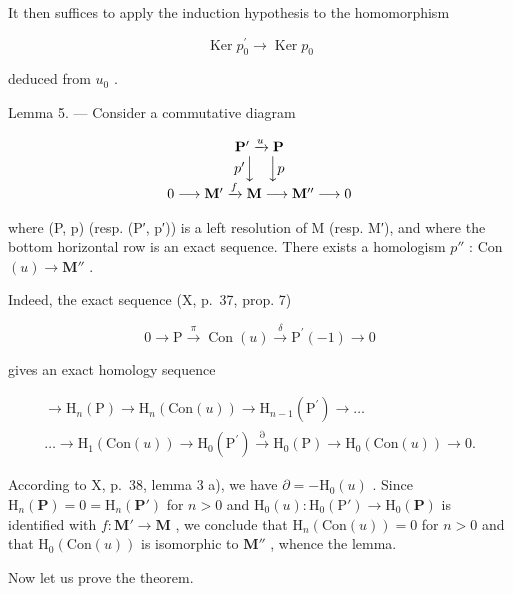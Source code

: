 It then suffices to apply the induction hypothesis to the homomorphism

\[
\operatorname{Ker} p _ {0} ^ {\prime} \rightarrow \operatorname{Ker} p _ {0}
\]

deduced from \(u_{0}\) .

Lemma 5. --- Consider a commutative diagram

\[
\begin{array}{c} \mathbf {P} ^ {\prime} \xrightarrow {u} \mathbf {P} \\ p ^ {\prime} \Big \downarrow \quad \Big \downarrow p \\ 0 \longrightarrow \mathbf {M} ^ {\prime} \xrightarrow {f} \mathbf {M} \longrightarrow \mathbf {M} ^ {\prime \prime} \longrightarrow 0 \end{array}
\]

where (P, p) (resp. (P′, p′)) is a left resolution of M (resp. M′), and where the bottom horizontal row is an exact sequence. There exists a homologism \(p''\) : Con \((u) \to \mathbf{M}''\) .

Indeed, the exact sequence (X, p.~37, prop. 7)

\[
0 \to \mathrm{P} \xrightarrow {\pi} \operatorname{Con} (u) \xrightarrow {\delta} \mathrm{P} ^ {\prime} (- 1) \to 0
\]

gives an exact homology sequence

\[
\begin{array}{c}\rightarrow \mathrm{H} _ {n} (\mathrm{P}) \rightarrow \mathrm{H} _ {n} (\mathrm{Con} (u)) \rightarrow \mathrm{H} _ {n - 1} (\mathrm{P} ^ {\prime}) \rightarrow \dots\\\dots \rightarrow \mathrm{H} _ {1} (\mathrm{Con} (u)) \rightarrow \mathrm{H} _ {0} (\mathrm{P} ^ {\prime}) \stackrel {{\partial}} {{\rightarrow}} \mathrm{H} _ {0} (\mathrm{P}) \rightarrow \mathrm{H} _ {0} (\mathrm{Con} (u)) \rightarrow 0.\end{array}
\]

According to X, p.~38, lemma 3 a), we have \(\partial = -\mathrm{H}_{0}(u)\) . Since \(\mathrm{H}_{n}(\mathbf{P}) = 0 = \mathrm{H}_{n}(\mathbf{P}')\) for \(n > 0\) and \(\mathrm{H}_{0}(u): \mathrm{H}_{0}(\mathrm{P}') \to \mathrm{H}_{0}(\mathbf{P})\) is identified with \(f: \mathbf{M}' \to \mathbf{M}\) , we conclude that \(\mathrm{H}_{n}(\mathrm{Con}(u)) = 0\) for \(n > 0\) and that \(\mathrm{H}_{0}(\mathrm{Con}(u))\) is isomorphic to \(\mathbf{M}''\) , whence the lemma.

Now let us prove the theorem.

